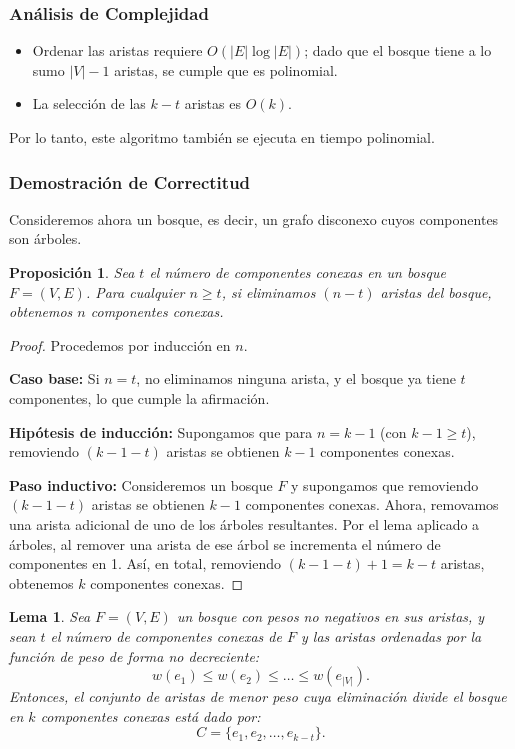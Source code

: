 \documentclass[a4paper, 12pt]{article}
\newtheorem{lemma}{Lema}[section]
\newtheorem{proposition}{Proposición}[section]
\begin{document}
\subsubsection{Análisis de Complejidad}
\begin{itemize}
    \item Ordenar las aristas requiere \( O(|E| \log |E|) \); dado que el bosque tiene a lo sumo \( |V|-1 \) aristas, se cumple que es polinomial.
    \item La selección de las \( k-t \) aristas es \( O(k) \).
\end{itemize}
Por lo tanto, este algoritmo también se ejecuta en tiempo polinomial.

\subsubsection{Demostración de Correctitud}

Consideremos ahora un bosque, es decir, un grafo disconexo cuyos componentes son árboles.

\begin{proposition}
Sea \( t \) el número de componentes conexas en un bosque \( F = (V, E) \). Para cualquier \( n \ge t \), si eliminamos \( (n-t) \) aristas del bosque, obtenemos \( n \) componentes conexas.
\end{proposition}

\begin{proof}
Procedemos por inducción en \( n \).

\textbf{Caso base:}  
Si \( n = t \), no eliminamos ninguna arista, y el bosque ya tiene \( t \) componentes, lo que cumple la afirmación.

\textbf{Hipótesis de inducción:}  
Supongamos que para \( n = k-1 \) (con \( k-1 \ge t \)), removiendo \( (k-1 - t) \) aristas se obtienen \( k-1 \) componentes conexas.

\textbf{Paso inductivo:}  
Consideremos un bosque \( F \) y supongamos que removiendo \( (k-1-t) \) aristas se obtienen \( k-1 \) componentes conexas.  
Ahora, removamos una arista adicional de uno de los árboles resultantes. Por el lema aplicado a árboles, al remover una arista de ese árbol se incrementa el número de componentes en 1.  
Así, en total, removiendo \( (k-1-t) + 1 = k-t \) aristas, obtenemos \( k \) componentes conexas.  
\end{proof}

\begin{lemma}
Sea \( F = (V, E) \) un bosque con pesos no negativos en sus aristas, y sean \( t \) el número de componentes conexas de \( F \) y las aristas ordenadas por la función de peso de forma no decreciente:
\[
w(e_1) \le w(e_2) \le \dots \le w(e_{|V|}).
\]
Entonces, el conjunto de aristas de menor peso cuya eliminación divide el bosque en \( k \) componentes conexas está dado por:
\[
C = \{ e_1, e_2, \dots, e_{k-t} \}.
\]
\end{lemma}
\end{document}
